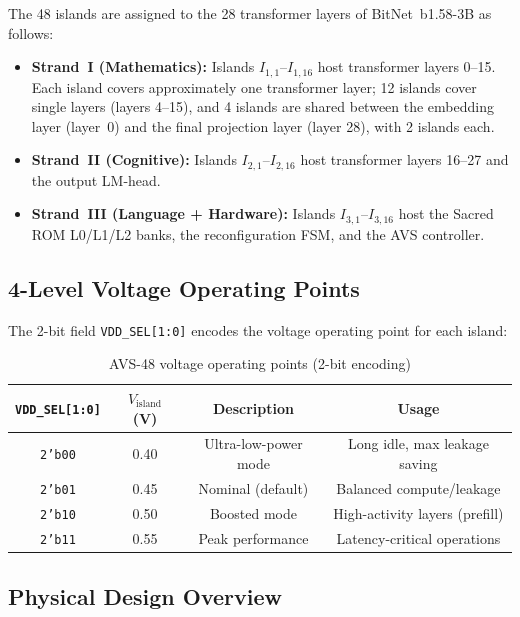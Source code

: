 The 48 islands are assigned to the 28 transformer layers of
BitNet~b1.58-3B \cite{bitnet_b158_2024} as follows:

\begin{itemize}
  \item \textbf{Strand~I (Mathematics):} Islands $I_{1,1}$--$I_{1,16}$
    host transformer layers 0--15.  Each island covers approximately
    one transformer layer; 12 islands cover single layers (layers 4--15),
    and 4 islands are shared between the embedding layer (layer~0) and
    the final projection layer (layer 28), with 2 islands each.
  \item \textbf{Strand~II (Cognitive):} Islands $I_{2,1}$--$I_{2,16}$
    host transformer layers 16--27 and the output LM-head.
  \item \textbf{Strand~III (Language + Hardware):} Islands
    $I_{3,1}$--$I_{3,16}$ host the Sacred ROM L0/L1/L2 banks, the
    reconfiguration FSM, and the AVS controller.
\end{itemize}

\subsection{4-Level Voltage Operating Points}

The 2-bit field \texttt{VDD\_SEL[1:0]} encodes the voltage operating
point for each island:

\begin{table}[ht]
\centering
\caption{AVS-48 voltage operating points (2-bit encoding)}
\label{tab:vdd_sel}
\begin{tabular}{cccc}
\hline
\texttt{VDD\_SEL[1:0]} & $V_\mathrm{island}$ (V) & Description & Usage \\
\hline
\texttt{2'b00} & 0.40 & Ultra-low-power mode & Long idle, max leakage saving \\
\texttt{2'b01} & 0.45 & Nominal (default)    & Balanced compute/leakage \\
\texttt{2'b10} & 0.50 & Boosted mode         & High-activity layers (prefill) \\
\texttt{2'b11} & 0.55 & Peak performance     & Latency-critical operations \\
\hline
\end{tabular}
\end{table}

\subsection{Physical Design Overview}

